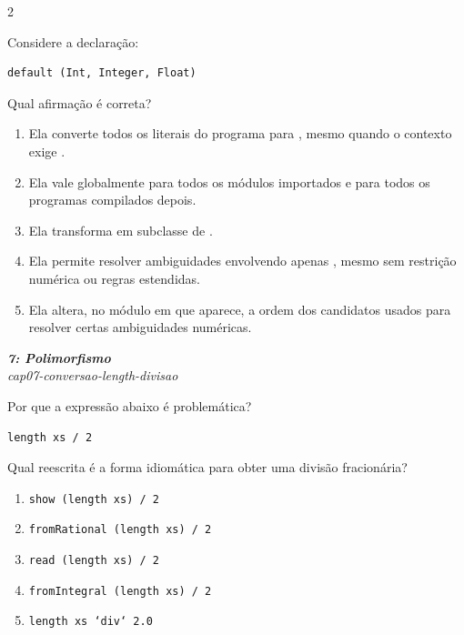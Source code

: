 \documentclass[a4paper,10pt,brazil]{article}
\begin{document}
\begin{multicols}{2}
\begin{flushright}
\end{flushright}
Considere a declaração:

\begin{verbatim}
default (Int, Integer, Float)
\end{verbatim}

Qual afirmação é correta?

\begin{enumerate}
  \item Ela converte todos os literais do programa para , mesmo quando o contexto exige .
  \item Ela vale globalmente para todos os módulos importados e para todos os programas compilados depois.
  \item Ela transforma  em subclasse de .
  \item Ela permite resolver ambiguidades envolvendo apenas , mesmo sem restrição numérica ou regras estendidas.
  \item Ela altera, no módulo em que aparece, a ordem dos candidatos usados para resolver certas ambiguidades numéricas.

\end{enumerate}

\begin{flushright}
  \footnotesize
  \textit{\textbf{7: Polimorfismo}}\\
  \textit{cap07-conversao-length-divisao}\\

\end{flushright}
Por que a expressão abaixo é problemática?

\begin{verbatim}
length xs / 2
\end{verbatim}

Qual reescrita é a forma idiomática para obter uma divisão fracionária?

\begin{enumerate}
  \item \texttt{show (length xs) / 2}
  \item \texttt{fromRational (length xs) / 2}
  \item \texttt{read (length xs) / 2}
  \item \texttt{fromIntegral (length xs) / 2}
  \item \texttt{length xs `div` 2.0}


\end{enumerate}
\end{multicols}
\end{document}
